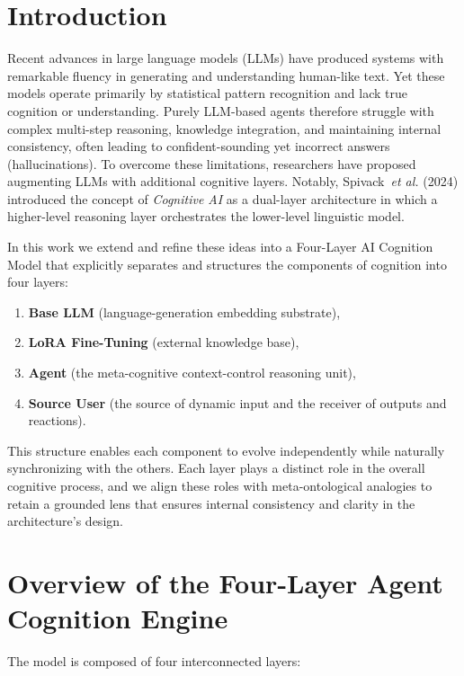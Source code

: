 \documentclass{article}
\begin{document}
\section{Introduction}
Recent advances in large language models (LLMs) have produced systems with remarkable fluency in generating and understanding human-like text. Yet these models operate primarily by statistical pattern recognition and lack true cognition or understanding. Purely LLM-based agents therefore struggle with complex multi-step reasoning, knowledge integration, and maintaining internal consistency, often leading to confident-sounding yet incorrect answers (hallucinations). To overcome these limitations, researchers have proposed augmenting LLMs with additional cognitive layers. Notably, Spivack~\emph{et al.} (2024) introduced the concept of \emph{Cognitive AI} as a dual-layer architecture in which a higher-level reasoning layer orchestrates the lower-level linguistic model.

In this work we extend and refine these ideas into a Four-Layer AI Cognition Model that explicitly separates and structures the components of cognition into four layers:

\begin{enumerate}
  \item \textbf{Base LLM} (language-generation embedding substrate),
  \item \textbf{LoRA Fine-Tuning} (external knowledge base),
  \item \textbf{Agent} (the meta-cognitive context-control reasoning unit),
  \item \textbf{Source User} (the source of dynamic input and the receiver of outputs and reactions).
\end{enumerate}

This structure enables each component to evolve independently while naturally synchronizing with the others. Each layer plays a distinct role in the overall cognitive process, and we align these roles with meta-ontological analogies to retain a grounded lens that ensures internal consistency and clarity in the architecture’s design.

\hrulefill

\section{Overview of the Four-Layer Agent Cognition Engine}

The model is composed of four interconnected layers:
\end{document}
